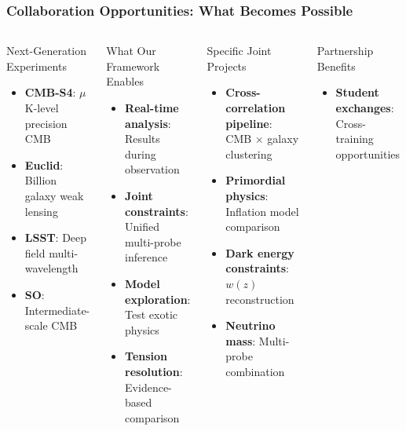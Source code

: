 \documentclass[aspectratio=169]{beamer}
\begin{document}
\begin{frame}
    \frametitle{Collaboration Opportunities: What Becomes Possible}
    \begin{columns}
        \begin{block}{Next-Generation Experiments}
            \begin{itemize}
                \item \textbf{CMB-S4}: $\mu$K-level precision CMB
                \item \textbf{Euclid}: Billion galaxy weak lensing
                \item \textbf{LSST}: Deep field multi-wavelength
                \item \textbf{SO}: Intermediate-scale CMB
            \end{itemize}
        \end{block}
        \begin{block}{What Our Framework Enables}
            \begin{itemize}
                \item \textbf{Real-time analysis}: Results during observation
                \item \textbf{Joint constraints}: Unified multi-probe inference
                \item \textbf{Model exploration}: Test exotic physics
                \item \textbf{Tension resolution}: Evidence-based comparison
            \end{itemize}
        \end{block}
        \begin{block}{Specific Joint Projects}
            \begin{itemize}
                \item \textbf{Cross-correlation pipeline}: CMB × galaxy clustering
                \item \textbf{Primordial physics}: Inflation model comparison
                \item \textbf{Dark energy constraints}: $w(z)$ reconstruction
                \item \textbf{Neutrino mass}: Multi-probe combination
            \end{itemize}
        \end{block}
        \begin{block}{Partnership Benefits}
            \begin{itemize}
                \item \textbf{Student exchanges}: Cross-training opportunities

\end{itemize}
\end{block}
\end{columns}
\end{frame}
\end{document}

